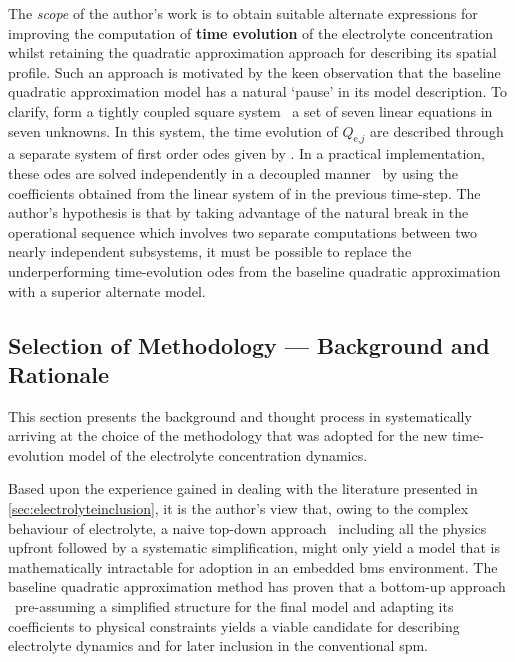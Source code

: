 The  \emph{scope}  of  the  author's   work  is  to  obtain  suitable  alternate
expressions  for  improving  the   computation  of  \textbf{time  evolution}  of
the  electrolyte  concentration  whilst retaining  the  quadratic  approximation
approach   for   describing  its   spatial   profile.   Such  an   approach   is
motivated   by    the   keen    observation   that   the    baseline   quadratic
approximation  model  has  a  natural  `pause'  in  its  model  description.  To
clarify,   form a  tightly
coupled  square  system  \ie~a  set   of  seven  linear  equations  in  seven
unknowns.   In   this   system,   the   time   evolution   of   $Q_{\text{e,}j}$
are   described  through   a  separate   system  of   first  order   \glspl{ode}
given by .  In a
practical  implementation,  these  \glspl{ode}  are solved  independently  in  a
decoupled  manner \ie~by  using  the coefficients  obtained  from the  linear
system of  in the previous
time-step. The  author's hypothesis is that  by taking advantage of  the natural
break  in the  operational  sequence which  involves  two separate  computations
between  two nearly  independent  subsystems,  it must  be  possible to  replace
the  underperforming  time-evolution  \glspl{ode} from  the  baseline  quadratic
approximation with a superior alternate model.

\subsection{Selection of Methodology --- Background and Rationale}\label{subsec:sysidbackground}


This  section presents  the  background and  thought  process in  systematically
arriving  at  the  choice of  the  methodology  that  was  adopted for  the  new
time-evolution model of the electrolyte concentration dynamics.

Based  upon the  experience  gained  in dealing  with  the literature  presented
in \cref{sec:electrolyteinclusion}, it is  the author's view that,  owing to the
complex behaviour of electrolyte, a  naive top-down approach \ie~including all
the physics upfront followed by a  systematic simplification, might only yield a
model that is  mathematically intractable for adoption in  an embedded \gls{bms}
environment.  The baseline  quadratic  approximation method  has  proven that  a
bottom-up approach \ie~pre-assuming a simplified structure for the final model
and adapting its coefficients to  physical constraints yields a viable candidate
for describing electrolyte dynamics and  for later inclusion in the conventional
\gls{spm}.

